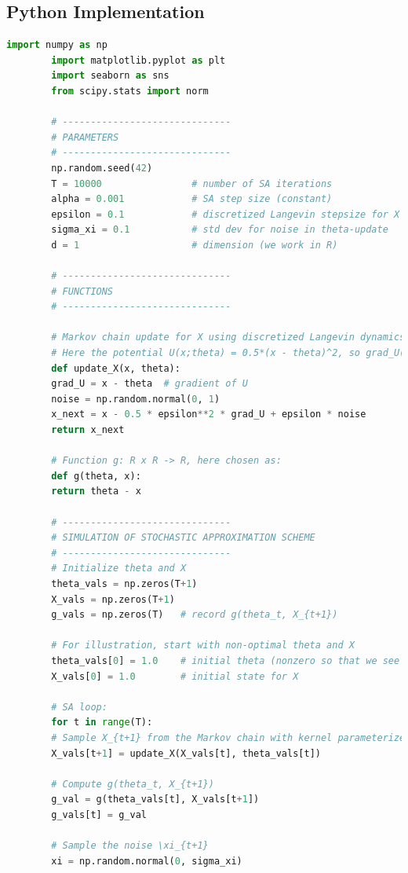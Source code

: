 \documentclass[a4paper]{article}
\begin{document}
	 \subsection*{Python Implementation}
	 
	 \begin{lstlisting}[language=Python, caption=Stochastic Approximation with Bias Tracking]
	 	import numpy as np
	 	import matplotlib.pyplot as plt
	 	import seaborn as sns
	 	from scipy.stats import norm
	 	
	 	# ------------------------------
	 	# PARAMETERS
	 	# ------------------------------
	 	np.random.seed(42)
	 	T = 10000                # number of SA iterations
	 	alpha = 0.001            # SA step size (constant)
	 	epsilon = 0.1            # discretized Langevin stepsize for X update
	 	sigma_xi = 0.1           # std dev for noise in theta-update
	 	d = 1                    # dimension (we work in R)
	 	
	 	# ------------------------------
	 	# FUNCTIONS
	 	# ------------------------------
	 	
	 	# Markov chain update for X using discretized Langevin dynamics.
	 	# Here the potential U(x;theta) = 0.5*(x - theta)^2, so grad_U(x,theta) = x - theta.
	 	def update_X(x, theta):
	 	grad_U = x - theta  # gradient of U
	 	noise = np.random.normal(0, 1)
	 	x_next = x - 0.5 * epsilon**2 * grad_U + epsilon * noise
	 	return x_next
	 	
	 	# Function g: R x R -> R, here chosen as:
	 	def g(theta, x):
	 	return theta - x
	 	
	 	# ------------------------------
	 	# SIMULATION OF STOCHASTIC APPROXIMATION SCHEME
	 	# ------------------------------
	 	# Initialize theta and X
	 	theta_vals = np.zeros(T+1)
	 	X_vals = np.zeros(T+1)
	 	g_vals = np.zeros(T)   # record g(theta_t, X_{t+1})
	 	
	 	# For illustration, start with non-optimal theta and X
	 	theta_vals[0] = 1.0    # initial theta (nonzero so that we see a drift toward theta^*=0)
	 	X_vals[0] = 1.0        # initial state for X
	 	
	 	# SA loop:
	 	for t in range(T):
	 	# Sample X_{t+1} from the Markov chain with kernel parameterized by theta_t
	 	X_vals[t+1] = update_X(X_vals[t], theta_vals[t])
	 	
	 	# Compute g(theta_t, X_{t+1})
	 	g_val = g(theta_vals[t], X_vals[t+1])
	 	g_vals[t] = g_val
	 	
	 	# Sample the noise \xi_{t+1}
	 	xi = np.random.normal(0, sigma_xi)
	 	

\end{lstlisting}
\end{document}
